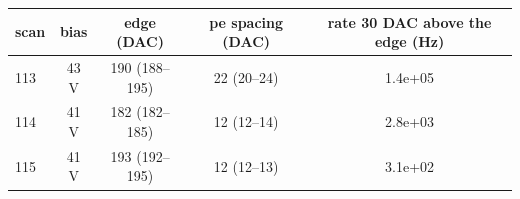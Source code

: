 \begin{tabular}{lcccc}
\toprule
scan & bias & edge (DAC) & pe spacing (DAC) & rate 30 DAC above the edge (Hz) \\
\midrule
113 & 43 V & 190 (188--195) & 22 (20--24) & 1.4e+05 \\
114 & 41 V & 182 (182--185) & 12 (12--14) & 2.8e+03 \\
115 & 41 V & 193 (192--195) & 12 (12--13) & 3.1e+02 \\
\bottomrule
\end{tabular}
